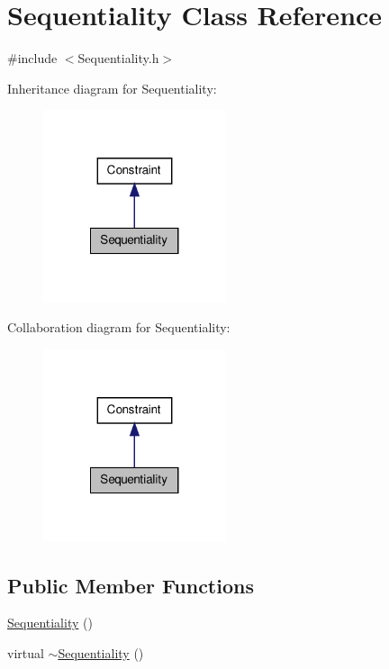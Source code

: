 \hypertarget{classSequentiality}{\section{\-Sequentiality \-Class \-Reference}
\label{classSequentiality}
}


{\ttfamily \#include $<$\-Sequentiality.\-h$>$}



\-Inheritance diagram for \-Sequentiality\-:\nopagebreak
\begin{figure}[H]
\begin{center}
\leavevmode
\includegraphics[width=152pt]{classSequentiality__inherit__graph}
\end{center}
\end{figure}


\-Collaboration diagram for \-Sequentiality\-:\nopagebreak
\begin{figure}[H]
\begin{center}
\leavevmode
\includegraphics[width=152pt]{classSequentiality__coll__graph}
\end{center}
\end{figure}
\subsection*{\-Public \-Member \-Functions}
\begin{DoxyCompactItemize}
\item 
\hyperlink{classSequentiality_a3d8c4d770b1e057ffe207c47f5db6179}{\-Sequentiality} ()
\item 
virtual \hyperlink{classSequentiality_a7c44312ff2bacacc1716da7594767fbc}{$\sim$\-Sequentiality} ()
\end{DoxyCompactItemize}
